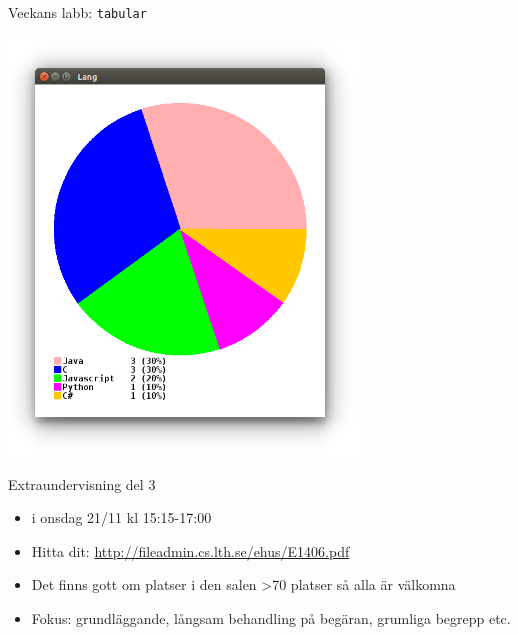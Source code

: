 \begin{SlideExtra}{Veckans labb: \texttt{tabular}}
\begin{minipage}{0.3\textwidth}
\vspace{2em}\includegraphics[width=0.7\textwidth]{../img/survey/pie}
\end{minipage}
\end{SlideExtra}

\begin{SlideExtra}{Extraundervisning del 3}
\begin{itemize}
\item  {} i  onsdag 21/11 kl 15:15-17:00
\item Hitta dit: \url{http://fileadmin.cs.lth.se/ehus/E1406.pdf}
\item Det finns gott om platser i den salen >70 platser så alla är välkomna
\item Fokus: grundläggande, långsam behandling på begäran, grumliga begrepp etc.
\end{itemize}
\end{SlideExtra}
\fi

